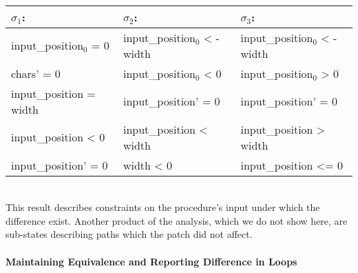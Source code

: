 \\
\begin{tabular}{l|l|l}
$\sigma_1$:                 & $\sigma_2$:                   & $\sigma_3$:
\\ \hline
input\_position${_0}$ = 0     & input\_position${_0}$  < -width & input\_position${_0}$  < -width
\\
chars' = 0                & input\_position${_0}$  < 0      & input\_position${_0}$  > 0
\\
input\_position = width   & input\_position' = 0        & input\_position' = 0
\\
input\_position < 0       & input\_position < width     & input\_position > width
\\
input\_position' = 0      & width < 0                   & input\_position <= 0
\\ \hline
\end{tabular}
\\
This result describes constraints on the procedure's input under which the difference exist. Another product of the analysis, which we do not show here, are sub-states describing paths which the patch did not affect.

\paragraph{Maintaining Equivalence and Reporting Difference in Loops}


